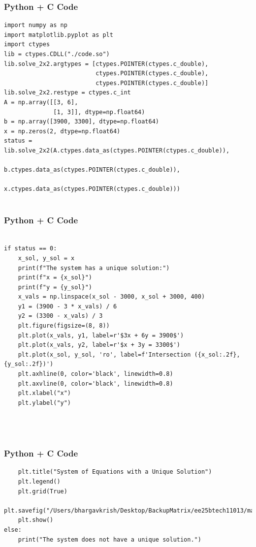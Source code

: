 \documentclass{beamer}
\begin{document}
\begin{frame}[fragile]
    \frametitle{Python + C Code}
    \begin{lstlisting}
import numpy as np
import matplotlib.pyplot as plt
import ctypes
lib = ctypes.CDLL("./code.so")   
lib.solve_2x2.argtypes = [ctypes.POINTER(ctypes.c_double),
                          ctypes.POINTER(ctypes.c_double),
                          ctypes.POINTER(ctypes.c_double)]
lib.solve_2x2.restype = ctypes.c_int
A = np.array([[3, 6],
              [1, 3]], dtype=np.float64)
b = np.array([3900, 3300], dtype=np.float64)
x = np.zeros(2, dtype=np.float64)
status = lib.solve_2x2(A.ctypes.data_as(ctypes.POINTER(ctypes.c_double)),
                       b.ctypes.data_as(ctypes.POINTER(ctypes.c_double)),
                       x.ctypes.data_as(ctypes.POINTER(ctypes.c_double)))


    \end{lstlisting}
\end{frame}

\begin{frame}[fragile]
    \frametitle{Python + C Code}
    \begin{lstlisting}

if status == 0:
    x_sol, y_sol = x
    print(f"The system has a unique solution:")
    print(f"x = {x_sol}")
    print(f"y = {y_sol}")
    x_vals = np.linspace(x_sol - 3000, x_sol + 3000, 400)
    y1 = (3900 - 3 * x_vals) / 6
    y2 = (3300 - x_vals) / 3
    plt.figure(figsize=(8, 8))
    plt.plot(x_vals, y1, label=r'$3x + 6y = 3900$')
    plt.plot(x_vals, y2, label=r'$x + 3y = 3300$')
    plt.plot(x_sol, y_sol, 'ro', label=f'Intersection ({x_sol:.2f}, {y_sol:.2f})')
    plt.axhline(0, color='black', linewidth=0.8)
    plt.axvline(0, color='black', linewidth=0.8)
    plt.xlabel("x")
    plt.ylabel("y")




    \end{lstlisting}
\end{frame}

\begin{frame}[fragile]
    \frametitle{Python + C Code}
    \begin{lstlisting}
    plt.title("System of Equations with a Unique Solution")
    plt.legend()
    plt.grid(True)
    plt.savefig("/Users/bhargavkrish/Desktop/BackupMatrix/ee25btech11013/matgeo/5.2.16/figs/Figure_1.png")
    plt.show()
else:
    print("The system does not have a unique solution.")


    \end{lstlisting}
\end{frame}
\end{document}
